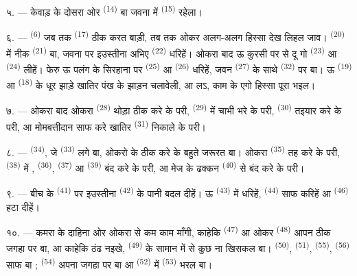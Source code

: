 ५. --- केवाड़ के दोसरा ओर 
\textsuperscript{(14)} बा जवना में 
\textsuperscript{(15)} रहेला।

६. ---  \textsuperscript{(6)} जब तक
 \textsuperscript{(17)} ठीक करत बाड़ी, तब तक ओकर अलग-अलग
हिस्सा देख लिहल जाव।  \textsuperscript{(20)} में
नीक  \textsuperscript{(21)} बा, जवना पर
इउस्तीना अभिए  \textsuperscript{(22)} धरिहें। ओकरा
बाद ऊ कुरसी पर से दू गो  \textsuperscript{(23)} आ
 \textsuperscript{(24)} लीहें। फेरु ऊ पलंग के सिरहाना पर
 \textsuperscript{(25)} आ 
\textsuperscript{(26)} धरिहें, जवन  \textsuperscript{(27)} के
साथे  \textsuperscript{(32)} पर बा। ऊ 
\textsuperscript{(19)} आ  \textsuperscript{(18)} के
धूर झाड़े खातिर पंख के झाड़न चलावेली, आ लऽ, काम के एगो हिस्सा पूरा भइल।

७. --- ओकरा बाद ओकरा  \textsuperscript{(28)}
थोड़ा ठीक करे के परी,  \textsuperscript{(29)} में चाभी
भरे के परी,  \textsuperscript{(30)} तइयार करे के परी,
आ मोमबत्तीदान साफ करे खातिर  \textsuperscript{(31)}
निकाले के परी।

\VUsaut{5.0mm}
\VUsaut{3.0mm}

८. ---  \textsuperscript{(34)}, जे 
\textsuperscript{(33)} लगे बा, ओकरो के ठीक करे के बहुते जरूरत बा। ओकरा
 \textsuperscript{(35)} तह करे के परी, 
\textsuperscript{(38)} में , 
\textsuperscript{(36)},  \textsuperscript{(37)} आ
 \textsuperscript{(39)} बंद करे के परी, आ मेज के ढक्कन
 \textsuperscript{(40)} से बंद करे के परी।

९. --- बीच के  \textsuperscript{(41)} पर इउस्तीना
 \textsuperscript{(42)} के पानी बदल दीहें। ऊ
 \textsuperscript{(43)} में  धरिहें,
 \textsuperscript{(44)} साफ करिहें आ  \textsuperscript{(46)} हटा दीहें।

१०. --- कमरा के दाहिना ओर ओकरा से कम काम माँगी, काहेकि 
\textsuperscript{(47)} आ ओकर  \textsuperscript{(48)} आपन ठीक
जगहा पर बा, आ काहेकि ठंढ नइखे,  \textsuperscript{(49)} के
सामान में से कुछ ना खिसकल बा।  \textsuperscript{(50)},
 \textsuperscript{(51)}, 
\textsuperscript{(55)},  \textsuperscript{(56)} साफ बा ;
 \textsuperscript{(54)} अपना जगहा पर बा आ  \textsuperscript{(52)} में 
\textsuperscript{(53)} भरल बा।

